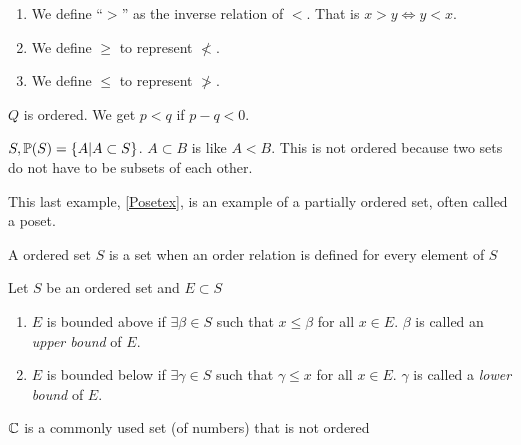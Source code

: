 \begin{corollary}
	\begin{enumerate}[]
		\item 	We define ``\( > \)'' as the inverse relation of \( < \).
			That is \( x > y \iff y < x \). 
		\item We define \( \ge \) to represent \( \not < \).
		\item We define \( \le \) to represent \( \not > \).
	\end{enumerate}
	\label{OtherSigns}
\end{corollary}

\begin{example}
	\( Q \) is ordered. We get \( p < q \) if \( p - q < 0 \).
\end{example}

\begin{example}
	\( S, \P(S) = \left\{ A | A \subset S \right\} \). \( A \subset B \) is like \( A < B \).
	This is not ordered because two sets do not have to be subsets of each other.
	\label{Posetex}
\end{example}
\begin{note}
	This last example, \ref{Posetex}, is an example of a partially ordered set, often called a
	poset.
\end{note}

\begin{definition}
	A ordered set \( S \) is a set when an order relation is defined for every element of \(
	S \)
\end{definition}

\begin{definition}
	Let \( S \) be an ordered set and \( E \subset S \)
	\begin{enumerate}[]
		\item \( E \) is bounded above if \( \exists \beta \in S \) such that 
			\( x \le \beta \) for all \( x \in E \). \( \beta \) is called an {\em upper bound}
			of \( E \).
		\item \( E \) is bounded below if \( \exists \gamma \in S \) such that 
			\( \gamma \le x \) for all \( x \in E \). 
			\( \gamma \) is called a {\em lower bound} of \( E \).
	\end{enumerate}
	\label{bounddef}
\end{definition}

\begin{note}
	\( \C \) is a commonly used set (of numbers) that is not ordered
\end{note}

